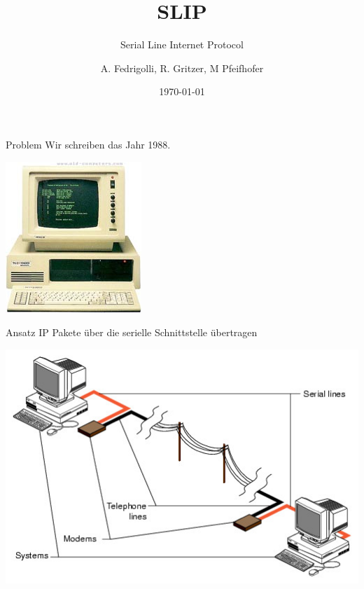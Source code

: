 \documentclass[beamer]{uibk}
\title{SLIP}
\subtitle{Serial Line Internet Protocol}
\author{A. Fedrigolli, R. Gritzer, M Pfeifhofer }
\date{\today}
\begin{document}
\maketitle

\begin{frame}{Problem}
  Wir schreiben das Jahr 1988.

  \includegraphics[scale=0.5]{1988computer.jpg}

\end{frame}

\begin{frame}{Ansatz}
  IP Pakete über die serielle Schnittstelle  übertragen
  \begin{center}
  \includegraphics[scale=0.5]{ansatz.jpg}
  \end{center}
\end{frame}
\end{document}
